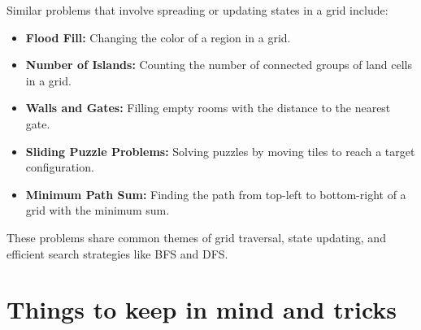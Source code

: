 Similar problems that involve spreading or updating states in a grid include:
\begin{itemize}
    \item \textbf{Flood Fill:} Changing the color of a region in a grid.
    
    \item \textbf{Number of Islands:} Counting the number of connected groups of land cells in a grid.
    
    \item \textbf{Walls and Gates:} Filling empty rooms with the distance to the nearest gate.
    
    \item \textbf{Sliding Puzzle Problems:} Solving puzzles by moving tiles to reach a target configuration.
    
    \item \textbf{Minimum Path Sum:} Finding the path from top-left to bottom-right of a grid with the minimum sum.
\end{itemize}

These problems share common themes of grid traversal, state updating, and efficient search strategies like BFS and DFS.

\section*{Things to keep in mind and tricks}

